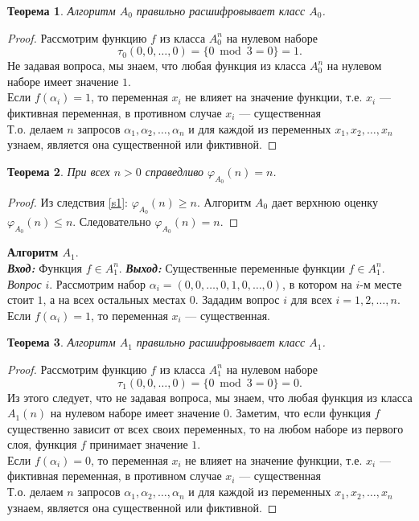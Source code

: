 \documentclass[oneside, final, 14pt]{extreport}
\newtheorem{thm}{Теорема}
\begin{document}
	 \begin{thm} 
	 	Алгоритм $A_0$ правильно расшифровывает класс $A_0$. 
	 \end{thm}
	 \begin{proof}
	 	Рассмотрим функцию $f$  из класса $A_0^n$ на нулевом наборе
	 	\[
	 	\tau_0(0, 0, \ldots, 0) =  \{0  \bmod 3 = 0\} = 1.
	 	\]
	 	Не задавая вопроса, мы знаем, что любая функция из класса $A_0^n$ на нулевом наборе имеет значение $1$.\\
	 	Если $f(\alpha_i) = 1$, то переменная $x_i$ не влияет на значение функции, т.е. $x_i$ --- 
	 	фиктивная переменная, в противном случае $x_i$ --- существенная \\
	 	Т.о. делаем $n$  запросов $\alpha_1, \alpha_2, \ldots, \alpha_n$ и для каждой из переменных $x_1, x_2, \ldots, x_n$ узнаем, является она существенной 
	 	или фиктивной. 
	 \end{proof} \par
	 
	\begin{thm} 
		При всех $n>0$ справедливо $\varphi_{A_0}(n) = n$.
	\end{thm}
	\begin{proof}
		Из следствия \ref{s1}: $\varphi_{A_0}(n) \geq n$. Алгоритм $A_0$ дает верхнюю оценку $\varphi_{A_0}(n) \leq n$. Следовательно 
		$\varphi_{A_0}(n) = n$.
	\end{proof} \par
	\noindent\textbf{Алгоритм $A_1$}. \\
	\emph{\textbf{Вход:}} Функция $f \in A_1^n$.
	\emph{\textbf{Выход:}} Существенные переменные функции $f \in A_1^n$.
	\emph{Вопрос} $i$. Рассмотрим набор $\alpha_i = (0, 0,  \ldots, 0, 1, 0, \ldots, 0)$, в котором на $i$-м месте стоит $1$, а на всех остальных местах $0$.
	Зададим вопрос $i$ для всех $i = 1, 2, \ldots, n$. Если $f(\alpha_i) = 1$, то переменная $x_i$ --- существенная. \\ 
	
	\begin{thm} 
		Алгоритм $A_1$ правильно расшифровывает класс $A_1$. 
	\end{thm}
	\begin{proof}
		Рассмотрим функцию $f$  из класса $A_1^n$ на нулевом наборе
		\[
		\tau_1(0, 0, \ldots, 0) =  \{0 \bmod  3 = 0\} = 0.
		\]
		Из этого следует, что не задавая вопроса, мы знаем, что любая функция из класса $A_1(n)$ на нулевом наборе имеет значение $0$.
		Заметим, что если функция $f$ существенно зависит от всех своих переменных, то на любом наборе из первого слоя, функция $f$ принимает
		значение $1$.\\
		Если $f(\alpha_i) = 0$, то переменная $x_i$ не влияет на значение функции, т.е. $x_i$ --- 
		фиктивная переменная, в противном случае $x_i$ --- существенная \\
		Т.о. делаем $n$  запросов $\alpha_1, \alpha_2, \ldots, \alpha_n$ и для каждой из переменных $x_1, x_2, \ldots, x_n$ узнаем, является она существенной 
		или фиктивной.
	\end{proof} \par
	
\end{document}
